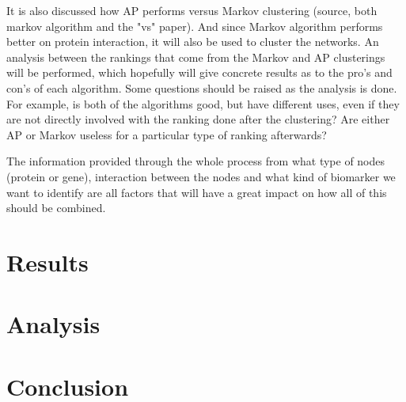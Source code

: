 \documentclass[UKenglish,11pt,a4paper]{article}
\begin{document}
It is also discussed how AP performs versus Markov clustering (source, both markov algorithm and the "vs" paper). And
since Markov algorithm performs better on protein interaction, it will also be used to cluster the networks. An analysis
between the rankings that come from the Markov and AP clusterings will be performed, which hopefully will give concrete
results as to the pro's and con's of each algorithm. Some questions should be raised as the analysis is done. For
example, is both of the algorithms good, but have different uses, even if they are not directly involved with the
ranking done after the clustering? Are either AP or Markov useless for a particular type of ranking afterwards?

The information provided through the whole process from what type of nodes (protein or gene), interaction between the
nodes and what kind of biomarker we want to identify are all factors that will have a great impact on how all of this
should be combined.
\part{Results}

\part{Analysis}

\part{Conclusion}

\backmatter{}
\printbibliography
\end{document}
